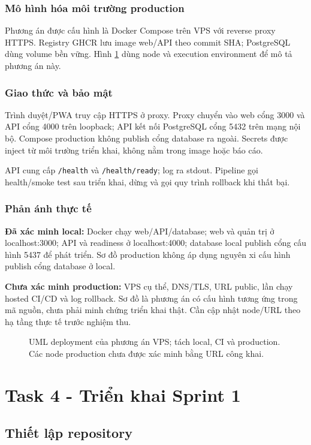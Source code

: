 \documentclass[12pt,a4paper]{article}
\newcommand{\tep}[1]{\nolinkurl{#1}}
\begin{document}
\subsubsection{Mô hình hóa môi trường production}
Phương án được cấu hình là Docker Compose trên VPS với reverse proxy HTTPS. Registry GHCR lưu image web/API theo commit SHA; PostgreSQL dùng volume bền vững. Hình \ref{fig:deployment} dùng node và execution environment để mô tả phương án này.

\subsubsection{Giao thức và bảo mật}
Trình duyệt/PWA truy cập HTTPS ở proxy. Proxy chuyển vào web cổng 3000 và API cổng 4000 trên loopback; API kết nối PostgreSQL cổng 5432 trên mạng nội bộ. Compose production không publish cổng database ra ngoài. Secrets được inject từ môi trường triển khai, không nằm trong image hoặc báo cáo.

API cung cấp \tep{/health} và \tep{/health/ready}; log ra stdout. Pipeline gọi health/smoke test sau triển khai, dừng và gọi quy trình rollback khi thất bại.

\subsubsection{Phản ánh thực tế}
\textbf{Đã xác minh local:} Docker chạy web/API/database; web và quản trị ở localhost:3000; API và readiness ở localhost:4000; database local publish cổng cấu hình 5437 để phát triển. Sơ đồ production không áp dụng nguyên xi cấu hình publish cổng database ở local.

\textbf{Chưa xác minh production:} VPS cụ thể, DNS/TLS, URL public, lần chạy hosted CI/CD và log rollback. Sơ đồ là phương án có cấu hình tương ứng trong mã nguồn, chưa phải minh chứng triển khai thật. Cần cập nhật node/URL theo hạ tầng thực tế trước nghiệm thu.

\begin{figure}[p]\centering

\caption{UML deployment của phương án VPS; tách local, CI và production. Các node production chưa được xác minh bằng URL công khai.}
\label{fig:deployment}
\end{figure}
\clearpage

\section{Task 4 - Triển khai Sprint 1}
\subsection{Thiết lập repository}
\end{document}
